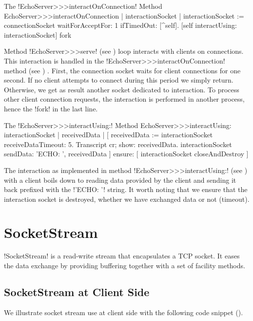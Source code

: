 \documentclass[a4paper,10pt,twoside]{book}
\begin{document}
\begin{method}{The \ct!EchoServer>>>interactOnConnection! Method}
EchoServer>>>interactOnConnection
	| interactionSocket |
	interactionSocket := connectionSocket waitForAcceptFor: 1 ifTimedOut: [^self].
	[self interactUsing: interactionSocket] fork
\end{method}

Method \ct!EchoServer>>>serve! (see ) loop interacts with clients on connections.
This interaction is handled in the \ct!EchoServer>>>interactOnConnection! method (see ) .
First, the connection socket waits for client connections for one second.
If no client attempts to connect during this period we simply return.
Otherwise, we get as result another socket dedicated to interaction.
To process other client connection requests, the interaction is performed in another process, hence the \ct!fork! in the last line.

\begin{method}{The \ct!EchoServer>>>interactUsing:! Method}
EchoServer>>>interactUsing: interactionSocket
	| receivedData |
	[ receivedData := interactionSocket receiveDataTimeout: 5.
	 Transcript cr; show: receivedData.
	 interactionSocket sendData: 'ECHO: ', receivedData
	] ensure: [
	 interactionSocket closeAndDestroy ]
\end{method}

The interaction as implemented in method \ct!EchoServer>>>interactUsing:! (see ) with a client boils down to reading data provided by the client and sending it back prefixed with the \ct!'ECHO: '! string.
It  worth noting that we ensure that the interaction socket is destroyed, whether we have exchanged data or not (timeout).

\section{SocketStream}
\label{sec:socketStream}
\ct!SocketStream! is a read-write stream that encapsulates a TCP socket.
It eases the data exchange by providing buffering together with a set of facility methods.

\subsection{SocketStream at Client Side}
We illustrate socket stream use at client side with the following code snippet ().
\end{document}
